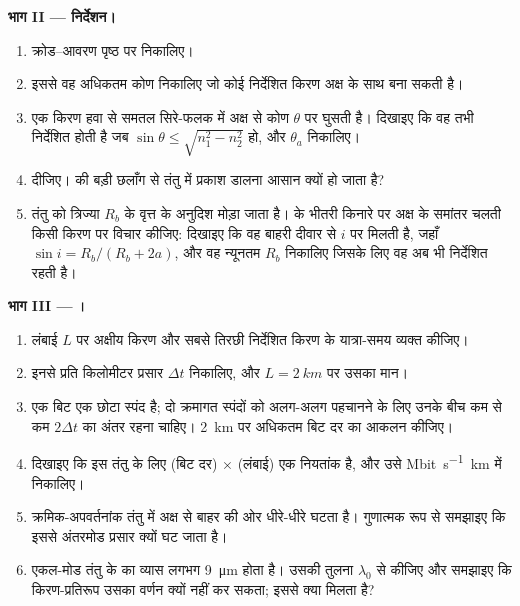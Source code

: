 \begin{problem}
\medskip
\noindent\textbf{भाग II --- निर्देशन।}
\begin{enumerate}[resume]
  \item क्रोड--आवरण पृष्ठ पर  निकालिए।
  \item इससे वह अधिकतम कोण निकालिए जो कोई निर्देशित किरण अक्ष के साथ बना
        सकती है।
  \item एक किरण हवा से समतल सिरे-फलक में अक्ष से कोण $\theta$ पर घुसती है।
        दिखाइए कि वह तभी निर्देशित होती है जब $\sin\theta \leq
        \sqrt{n_1^2 - n_2^2}$ हो, और 
        $\theta_a$ निकालिए।
  \item {} दीजिए।  की बड़ी छलाँग से तंतु में प्रकाश
        डालना आसान क्यों हो जाता है?
  \item तंतु को त्रिज्या $R_b$ के वृत्त के अनुदिश मोड़ा जाता है।  के
        भीतरी किनारे पर अक्ष के समांतर चलती किसी किरण पर विचार कीजिए:
        दिखाइए कि वह बाहरी दीवार से  $i$ पर मिलती है, जहाँ
        $\sin i = R_b/(R_b + 2a)$, और वह न्यूनतम $R_b$ निकालिए जिसके लिए
        वह अब भी निर्देशित रहती है।
\end{enumerate}

\medskip
\noindent\textbf{भाग III --- ।}
\begin{enumerate}[resume]
  \item लंबाई $L$ पर अक्षीय किरण और सबसे तिरछी निर्देशित किरण के यात्रा-समय
        व्यक्त कीजिए।
  \item इनसे प्रति किलोमीटर प्रसार $\Delta t$ निकालिए, और
        $L = \qty{2}{km}$ पर उसका मान।
  \item एक बिट एक छोटा स्पंद है; दो क्रमागत स्पंदों को अलग-अलग पहचानने के
        लिए उनके बीच कम से कम $2\Delta t$ का अंतर रहना चाहिए। \qty{2}{km}
        पर अधिकतम बिट दर का आकलन कीजिए।
  \item दिखाइए कि इस तंतु के लिए (बिट दर) $\times$ (लंबाई) एक नियतांक है,
        और उसे \unit{Mbit.s^{-1}.km} में निकालिए।
  \item क्रमिक-अपवर्तनांक तंतु में  अक्ष से बाहर की ओर धीरे-धीरे
        घटता है। गुणात्मक रूप से समझाइए कि इससे अंतरमोड प्रसार क्यों घट
        जाता है।
  \item एकल-मोड तंतु के  का व्यास लगभग \qty{9}{\micro m} होता है।
        उसकी तुलना $\lambda_0$ से कीजिए और समझाइए कि किरण-प्रतिरूप उसका
        वर्णन क्यों नहीं कर सकता; इससे क्या मिलता है?
\end{enumerate}


\end{problem}
